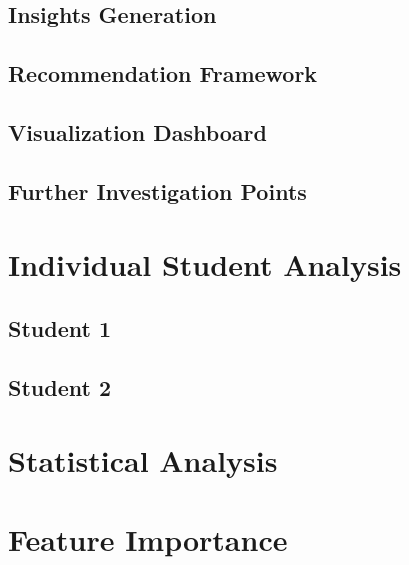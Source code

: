 \documentclass{article}
\begin{document}
\subsection{Insights Generation}

\subsection{Recommendation Framework}

\subsection{Visualization Dashboard}

\subsection{Further Investigation Points}

\section{Individual Student Analysis}
\subsection{Student 1}

\subsection{Student 2}


\section{Statistical Analysis}

\section{Feature Importance}
\end{document}
